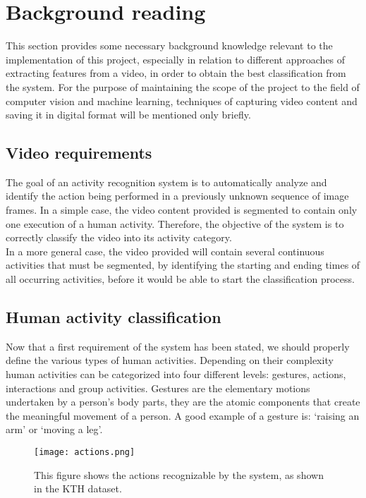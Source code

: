 \documentclass[11pt]{report}
\begin{document}
\clearpage

\chapter{Background reading}
This section provides some necessary background knowledge relevant to the implementation of this project, especially in relation to different approaches of extracting features from a video, in order to obtain the best classification from the system. For the purpose of maintaining the scope of the project to the field of computer vision and machine learning, techniques of capturing video content and saving it in digital format will be mentioned only briefly. \\

\section{Video requirements}
The goal of an activity recognition system is to automatically analyze and identify the action being performed in a previously unknown sequence of image frames. In a simple case, the video content provided is segmented to contain only one execution of a human activity. Therefore, the objective of the system is to correctly classify the video into its activity category. \\
In a more general case, the video provided will contain several continuous activities that must be segmented, by identifying the starting and ending times of all occurring activities, before it would be able to start the classification process. \\

\section{Human activity classification}
Now that a first requirement of the system has been stated, we should properly define the various types of human activities. Depending on their complexity human activities can be categorized into four different levels: gestures, actions, interactions and group activities. 
Gestures are the elementary motions undertaken by a person's body parts, they are the atomic components that create the meaningful movement of a person. A good example of a gesture is: ‘raising an arm’ or ‘moving a leg’. \\

\begin{figure}
    \centering
    \texttt{[image: actions.png]}
    \caption{This figure shows the actions recognizable by the system, as shown in the KTH dataset.}
    \label{fig:actions}
\end{figure}
\end{document}
